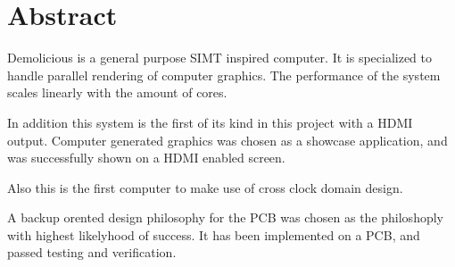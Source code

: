 \documentclass[../main/report.tex]{subfiles}
\begin{document}
\chapter*{Abstract}
\label{sec:abstract}

\vspace*{\fill}

Demolicious is a general purpose SIMT inspired computer.
It is specialized to handle parallel rendering of computer graphics.
The performance of the system scales linearly with the amount of cores.

In addition this system is the first of its kind in this project with a HDMI output.
Computer generated graphics was chosen as a showcase application, and was successfully shown on a HDMI enabled screen.

Also this is the first computer to make use of cross clock domain design.

A backup orented design philosophy for the PCB was chosen as the philoshoply with highest likelyhood of success.
It has been implemented on a PCB, and passed testing and verification.

\vspace*{\fill}
\end{document}
